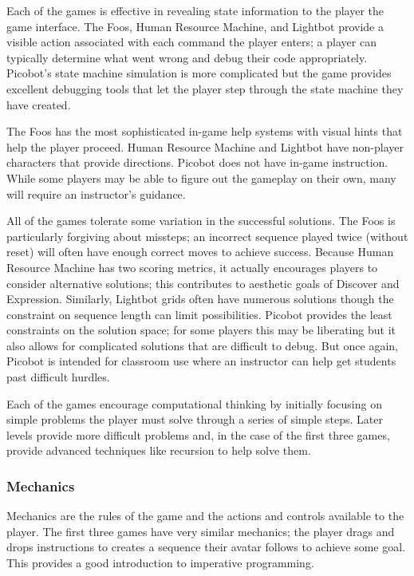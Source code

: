 \documentclass{sig-alternate-05-2015}
\begin{document}
Each of the games is effective in revealing state information to the player the game interface. The Foos, Human Resource Machine, and Lightbot provide a visible action associated with each command the player enters; a player can typically determine what went wrong and debug their code appropriately. Picobot's state machine simulation is more complicated but the game provides excellent debugging tools that let the player step through the state machine they have created.



The Foos has the most sophisticated in-game help systems with visual hints that help the player proceed. Human Resource Machine and Lightbot have non-player characters that provide directions. Picobot does not have in-game instruction. While some players may be able to figure out the gameplay on their own, many will require an instructor's guidance.



All of the games tolerate some variation in the successful solutions. The Foos is particularly forgiving about missteps; an incorrect sequence played twice (without reset) will often have enough correct moves to achieve success. Because Human Resource Machine has two scoring metrics, it actually encourages players to consider alternative solutions; this contributes to aesthetic goals of Discover and Expression. Similarly, Lightbot grids often have numerous solutions though the constraint on sequence length can limit possibilities. Picobot provides the least constraints on the solution space; for some players this may be liberating but it also allows for complicated solutions that are difficult to debug. But once again, Picobot is intended for classroom use where an instructor can help get students past difficult hurdles.



Each of the games encourage computational thinking by initially focusing on simple problems the player must solve through a series of simple steps. Later levels provide more difficult problems and, in the case of the first three games, provide advanced techniques like recursion to help solve them. \subsubsection{Mechanics}


Mechanics are the rules of the game and the actions and controls available to the player. The first three games have very similar mechanics; the player drags and drops instructions to creates a sequence their avatar follows to achieve some goal. This provides a good introduction to imperative programming.
\end{document}
